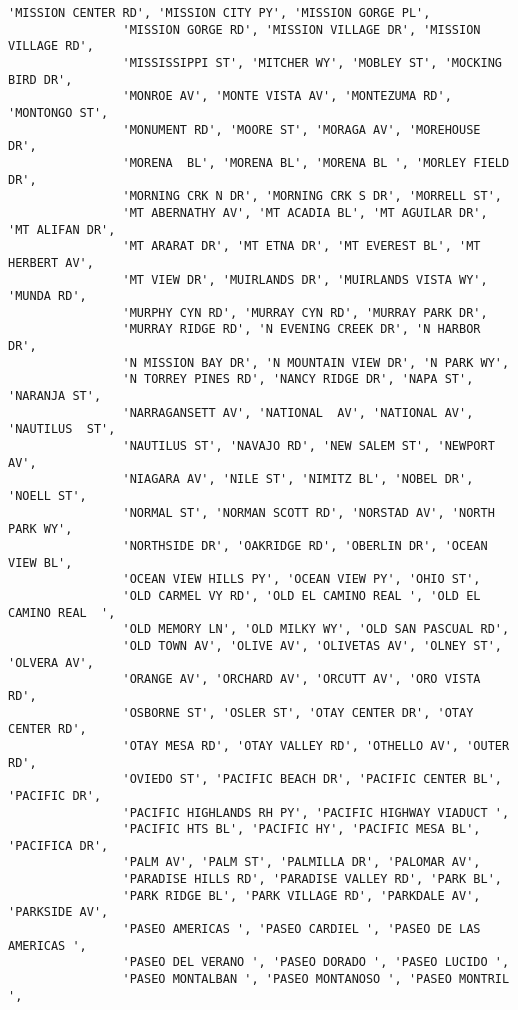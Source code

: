 \documentclass[11pt]{article}
\begin{document}
\begin{Verbatim}[commandchars=\\\{\}]
                'MISSION CENTER RD', 'MISSION CITY PY', 'MISSION GORGE PL',
                'MISSION GORGE RD', 'MISSION VILLAGE DR', 'MISSION VILLAGE RD',
                'MISSISSIPPI ST', 'MITCHER WY', 'MOBLEY ST', 'MOCKING BIRD DR',
                'MONROE AV', 'MONTE VISTA AV', 'MONTEZUMA RD', 'MONTONGO ST',
                'MONUMENT RD', 'MOORE ST', 'MORAGA AV', 'MOREHOUSE DR',
                'MORENA  BL', 'MORENA BL', 'MORENA BL ', 'MORLEY FIELD DR',
                'MORNING CRK N DR', 'MORNING CRK S DR', 'MORRELL ST',
                'MT ABERNATHY AV', 'MT ACADIA BL', 'MT AGUILAR DR', 'MT ALIFAN DR',
                'MT ARARAT DR', 'MT ETNA DR', 'MT EVEREST BL', 'MT HERBERT AV',
                'MT VIEW DR', 'MUIRLANDS DR', 'MUIRLANDS VISTA WY', 'MUNDA RD',
                'MURPHY CYN RD', 'MURRAY CYN RD', 'MURRAY PARK DR',
                'MURRAY RIDGE RD', 'N EVENING CREEK DR', 'N HARBOR DR',
                'N MISSION BAY DR', 'N MOUNTAIN VIEW DR', 'N PARK WY',
                'N TORREY PINES RD', 'NANCY RIDGE DR', 'NAPA ST', 'NARANJA ST',
                'NARRAGANSETT AV', 'NATIONAL  AV', 'NATIONAL AV', 'NAUTILUS  ST',
                'NAUTILUS ST', 'NAVAJO RD', 'NEW SALEM ST', 'NEWPORT AV',
                'NIAGARA AV', 'NILE ST', 'NIMITZ BL', 'NOBEL DR', 'NOELL ST',
                'NORMAL ST', 'NORMAN SCOTT RD', 'NORSTAD AV', 'NORTH PARK WY',
                'NORTHSIDE DR', 'OAKRIDGE RD', 'OBERLIN DR', 'OCEAN VIEW BL',
                'OCEAN VIEW HILLS PY', 'OCEAN VIEW PY', 'OHIO ST',
                'OLD CARMEL VY RD', 'OLD EL CAMINO REAL ', 'OLD EL CAMINO REAL  ',
                'OLD MEMORY LN', 'OLD MILKY WY', 'OLD SAN PASCUAL RD',
                'OLD TOWN AV', 'OLIVE AV', 'OLIVETAS AV', 'OLNEY ST', 'OLVERA AV',
                'ORANGE AV', 'ORCHARD AV', 'ORCUTT AV', 'ORO VISTA RD',
                'OSBORNE ST', 'OSLER ST', 'OTAY CENTER DR', 'OTAY CENTER RD',
                'OTAY MESA RD', 'OTAY VALLEY RD', 'OTHELLO AV', 'OUTER RD',
                'OVIEDO ST', 'PACIFIC BEACH DR', 'PACIFIC CENTER BL', 'PACIFIC DR',
                'PACIFIC HIGHLANDS RH PY', 'PACIFIC HIGHWAY VIADUCT ',
                'PACIFIC HTS BL', 'PACIFIC HY', 'PACIFIC MESA BL', 'PACIFICA DR',
                'PALM AV', 'PALM ST', 'PALMILLA DR', 'PALOMAR AV',
                'PARADISE HILLS RD', 'PARADISE VALLEY RD', 'PARK BL',
                'PARK RIDGE BL', 'PARK VILLAGE RD', 'PARKDALE AV', 'PARKSIDE AV',
                'PASEO AMERICAS ', 'PASEO CARDIEL ', 'PASEO DE LAS AMERICAS ',
                'PASEO DEL VERANO ', 'PASEO DORADO ', 'PASEO LUCIDO ',
                'PASEO MONTALBAN ', 'PASEO MONTANOSO ', 'PASEO MONTRIL ',

\end{Verbatim}
\end{document}

